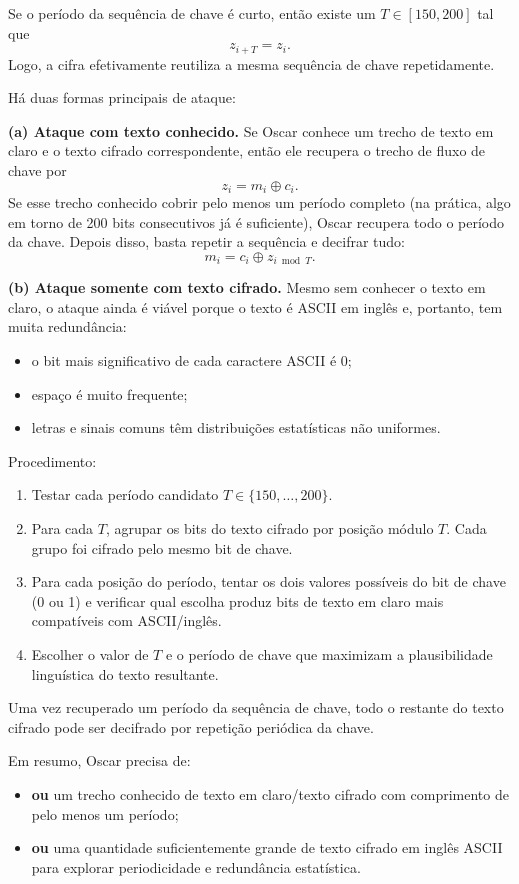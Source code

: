 \documentclass[12pt,a4paper]{article}
\newenvironment{resposta}{%
    \begin{respostabox}
    \color{red!70!black}\sloppy
}{%
    \end{respostabox}
}
\begin{document}
\begin{resposta}

Se o período da sequência de chave é curto, então existe um $T \in [150,200]$ tal que
\[
z_{i+T} = z_i.
\]
Logo, a cifra efetivamente reutiliza a mesma sequência de chave repetidamente.

Há duas formas principais de ataque:

\textbf{(a) Ataque com texto conhecido.} Se Oscar conhece um trecho de texto em claro e o texto cifrado correspondente, então ele recupera o trecho de fluxo de chave por
\[
z_i = m_i \oplus c_i.
\]
Se esse trecho conhecido cobrir pelo menos um período completo (na prática, algo em torno de 200 bits consecutivos já é suficiente), Oscar recupera todo o período da chave. Depois disso, basta repetir a sequência e decifrar tudo:
\[
m_i = c_i \oplus z_{i \bmod T}.
\]

\textbf{(b) Ataque somente com texto cifrado.} Mesmo sem conhecer o texto em claro, o ataque ainda é viável porque o texto é ASCII em inglês e, portanto, tem muita redundância:
\begin{itemize}
    \item o bit mais significativo de cada caractere ASCII é 0;
    \item espaço é muito frequente;
    \item letras e sinais comuns têm distribuições estatísticas não uniformes.
\end{itemize}

Procedimento:
\begin{enumerate}[label=\arabic*.]
    \item Testar cada período candidato $T \in \{150,\ldots,200\}$.
    \item Para cada $T$, agrupar os bits do texto cifrado por posição módulo $T$. Cada grupo foi cifrado pelo mesmo bit de chave.
    \item Para cada posição do período, tentar os dois valores possíveis do bit de chave (0 ou 1) e verificar qual escolha produz bits de texto em claro mais compatíveis com ASCII/inglês.
    \item Escolher o valor de $T$ e o período de chave que maximizam a plausibilidade linguística do texto resultante.
\end{enumerate}

Uma vez recuperado um período da sequência de chave, todo o restante do texto cifrado pode ser decifrado por repetição periódica da chave.

Em resumo, Oscar precisa de:
\begin{itemize}
    \item \textbf{ou} um trecho conhecido de texto em claro/texto cifrado com comprimento de pelo menos um período;
    \item \textbf{ou} uma quantidade suficientemente grande de texto cifrado em inglês ASCII para explorar periodicidade e redundância estatística.
\end{itemize}
\end{resposta}
\end{document}

